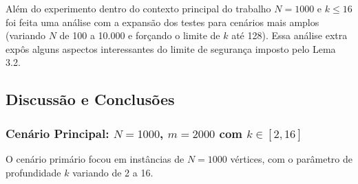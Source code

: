 \documentclass[10pt,a4paper]{article}
\begin{document}
Além do experimento dentro do contexto principal do trabalho $N = 1000$ e $k \le 16$ foi feita uma análise com a expansão dos testes para cenários mais amplos (variando $N$ de 100 a 10.000 e forçando o limite de $k$ até 128). Essa análise extra expôs alguns aspectos interessantes do limite de segurança imposto pelo Lema 3.2.

\subsection{Discussão e Conclusões}


\subsubsection{Cenário Principal: $N=1000$, $m=2000$ com $k \in [2, 16]$}

O cenário primário focou em instâncias de $N=1000$ vértices, com o parâmetro de profundidade $k$ variando de 2 a 16.

\begin{table}[H]
\centering
\caption{Análise de Sensibilidade da Poda (Lema 3.2) em Grafos Esparsos N=1000. Tempos convertidos para milissegundos (ms).}
\label{tab:exp2_sensitivity}
\end{table}
\end{document}
